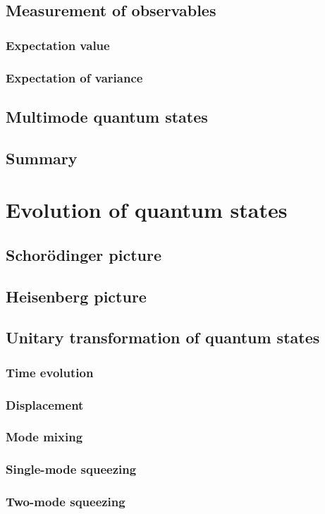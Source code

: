\documentclass{book}
\begin{document}
\section{Measurement of observables}
\subsection{Expectation value}
\subsection{Expectation of variance}
\section{Multimode quantum states}
\section{Summary}

\chapter{Evolution of quantum states}
\section{Schor\"odinger picture}
\section{Heisenberg picture}
\section{Unitary transformation of quantum states}
\subsection{Time evolution}
\subsection{Displacement}
\subsection{Mode mixing}
\subsection{Single-mode squeezing}
\subsection{Two-mode squeezing}
\end{document}
